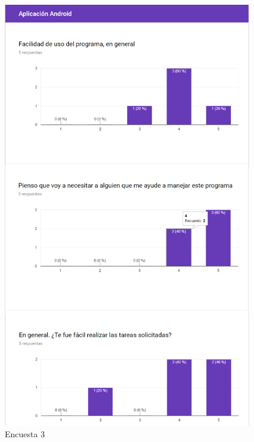 \documentclass{pclass}
\begin{document}
\begin{figure}[H]
	\centering
	\includegraphics[width=0.97\textwidth]{img/tercera}
	\caption{Encuesta 3}
	\label{fig:terceraEncuesta}
\end{figure}
\end{document}
